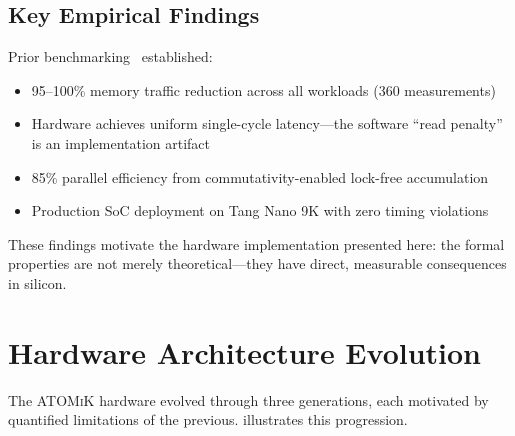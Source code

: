 \documentclass[11pt,letterpaper]{article}
\theoremstyle{plain}
\theoremstyle{definition}
\theoremstyle{remark}
\newcommand{\atomik}{\textsc{ATOMiK}}
\begin{document}
\subsection{Key Empirical Findings}

Prior benchmarking~\cite{paper2} established:
\begin{itemize}
    \item 95--100\% memory traffic reduction across all workloads (360 measurements)
    \item Hardware achieves uniform single-cycle latency---the software ``read penalty'' is an implementation artifact
    \item 85\% parallel efficiency from commutativity-enabled lock-free accumulation
    \item Production SoC deployment on Tang Nano 9K with zero timing violations
\end{itemize}

These findings motivate the hardware implementation presented here: the formal properties are not merely theoretical---they have direct, measurable consequences in silicon.

\section{Hardware Architecture Evolution}
\label{sec:architecture}

The \atomik{} hardware evolved through three generations, each motivated by quantified limitations of the previous.  illustrates this progression.
\end{document}
